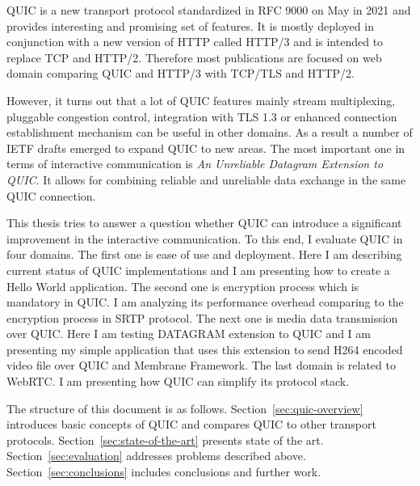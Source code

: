 QUIC is a new transport protocol standardized in RFC 9000 on May in 2021 and provides interesting and promising set of features.
%
It is mostly deployed in conjunction with a new version of HTTP called HTTP/3 and is intended to replace TCP and HTTP/2.
Therefore most publications are focused on web domain comparing QUIC and HTTP/3 with TCP/TLS and HTTP/2.

However, it turns out that a lot of QUIC features mainly stream multiplexing, pluggable congestion control, integration with TLS 1.3
or enhanced connection establishment mechanism can be useful in other domains.
As a result a number of IETF drafts emerged to expand QUIC to new areas.
The most important one in terms of interactive communication is \textit{An Unreliable Datagram Extension to QUIC}.
It allows for combining reliable and unreliable data exchange in the same QUIC connection.

This thesis tries to answer a question whether QUIC can introduce a significant improvement in the interactive communication.
To this end, I evaluate QUIC in four domains.
The first one is ease of use and deployment.
Here I am describing current status of QUIC implementations and I am presenting how to create a Hello World application.
The second one is encryption process which is mandatory in QUIC\@.
I am analyzing its performance overhead comparing to the encryption process in SRTP protocol.
The next one is media data transmission over QUIC\@.
Here I am testing DATAGRAM extension to QUIC and I am presenting my simple application that uses this extension to send H264 encoded video file over QUIC and Membrane Framework.
The last domain is related to WebRTC\@.
I am presenting how QUIC can simplify its protocol stack.

The structure of this document is as follows.
Section~\ref{sec:quic-overview} introduces basic concepts of QUIC and compares QUIC to other transport protocols.
Section~\ref{sec:state-of-the-art} presents state of the art.
Section~\ref{sec:evaluation} addresses problems described above.
Section~\ref{sec:conclusions} includes conclusions and further work. 

